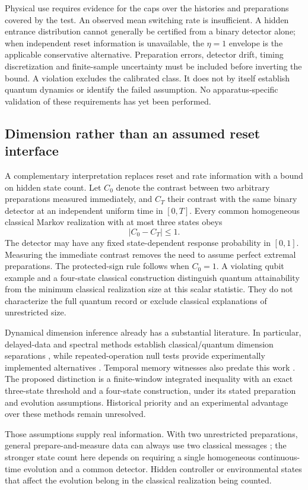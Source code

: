 Physical use requires evidence for the caps over the histories and preparations
covered by the test. An observed mean switching rate is insufficient. A hidden
entrance distribution cannot generally be certified from a binary detector
alone; when independent reset information is unavailable, the $\eta=1$ envelope
is the applicable conservative alternative. Preparation errors, detector drift,
timing discretization and finite-sample uncertainty must be included before
inverting the bound. A violation excludes the calibrated class. It does not by
itself establish quantum dynamics or identify the failed assumption. No
apparatus-specific validation of these requirements has yet been performed.

\subsection{Dimension rather than an assumed reset interface}

A complementary interpretation replaces reset and rate information with a
bound on hidden state count. Let $C_0$ denote the contrast between two arbitrary
preparations measured immediately, and $C_T$ their contrast with the same binary
detector at an independent uniform time in $[0,T]$. Every common homogeneous
classical Markov realization with at most three states obeys
\[
 |C_0-C_T|\leq1.
\]
The detector may have any fixed state-dependent response probability in $[0,1]$.
Measuring the immediate contrast removes the need to assume perfect extremal
preparations. The protected-sign rule follows when $C_0=1$. A violating qubit
example and a four-state classical construction distinguish quantum
attainability from the minimum classical realization size at this scalar
statistic. They do not characterize the full quantum record or exclude
classical explanations of unrestricted size.

Dynamical dimension inference already has a substantial literature. In
particular, delayed-data and spectral methods establish classical/quantum
dimension separations \cite{rrWolf2009}, while repeated-operation null tests
provide experimentally implemented alternatives \cite{rrBialecki2024}.
Temporal memory witnesses also predate this work
\cite{rrBudroni2019,rrVieira2022}. The proposed distinction is a finite-window
integrated inequality with an exact three-state threshold and a four-state
construction, under its stated preparation and evolution assumptions. Historical
priority and an experimental advantage over these methods remain unresolved.

Those assumptions supply real information. With two unrestricted preparations,
general prepare-and-measure data can always use two classical messages
\cite{rrGallego2010}; the stronger state count here depends on requiring a
single homogeneous continuous-time evolution and a common detector. Hidden
controller or environmental states that affect the evolution belong in the
classical realization being counted.
